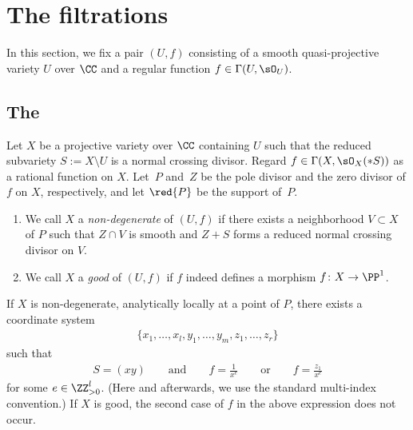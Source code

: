 \section{The filtrations}\label{sect:Fil}

In this section, we fix a pair $(U,f)$ consisting of a smooth quasi-projective variety $U$ over $\CC$ and a regular function $f\in\Gamma(U,\sO_U)$.

\subsection{The \cpt}
Let $X$ be a projective variety over $\CC$ containing $U$ such that the reduced subvariety $S := X\setminus U$ is a normal crossing divisor. Regard $f\in\Gamma(X,\sO_X(*S))$ as a rational function on $X$. Let~$P$ and~$Z$ be the pole divisor and the zero divisor of $f$ on $X$, respectively, and let $\red{P}$ be the support of~$P$.

\begin{definition*}\quad\begin{enumerate}\itemsep=0pt
\item[(i)] We call $X$ a \textit{non-degenerate {\cpt}} of $(U,f)$ if there exists a neighborhood $V \subset X$ of $P$ such that $Z\cap V$ is smooth and $Z+S$ forms a reduced normal crossing divisor on $V$.

\item[(ii)] We call $X$ a \textit{good {\cpt}} of $(U,f)$ if $f$ indeed defines a morphism $f\colon X \to \PP^1$.
\end{enumerate}
\end{definition*}

If $X$ is non-degenerate, analytically locally at a point of $P$, there exists a coordinate system
\begin{gather*} \{x_1,\dots,x_l, y_1,\dots,y_m,z_1,\dots,z_r\} \end{gather*}
such that
\begin{gather}\label{eq:non-deg-local}
S = (xy) \qquad\text{and}\qquad f= \frac{1}{x^e} \qquad\text{or}\qquad f = \frac{z_1}{x^e}
\end{gather}
for some $e \in \ZZ_{>0}^l$. (Here and afterwards, we use the standard multi-index convention.) If $X$ is good, the second case of $f$ in the above expression does not occur.

